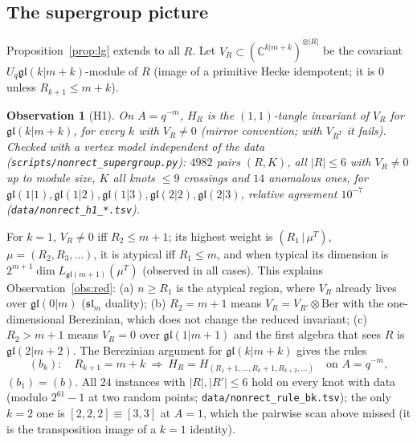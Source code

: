 \documentclass[11pt]{article}
\newtheorem{observation}{Observation}
\theoremstyle{definition}
\theoremstyle{remark}
\begin{document}
\subsection{The supergroup picture}\label{sec:super}
Proposition~\ref{prop:lg} extends to all $R$.  Let $V_R\subset(\mathbb{C}^{k|m+k})^{\otimes|R|}$ be the covariant
$U_q\mathfrak{gl}(k|m+k)$-module of $R$ (image of a primitive Hecke idempotent; it is $0$ unless $R_{k+1}\le m+k$).
\begin{observation}[H1]\label{obs:h1}
On $A=q^{-m}$, $H_R$ is the $(1,1)$-tangle invariant of $V_R$ for $\mathfrak{gl}(k|m+k)$, for every $k$ with
$V_R\ne0$ (mirror convention; with $V_{R^T}$ it fails).  Checked with a vertex model independent of the data
(\texttt{scripts/nonrect\_supergroup.py}): $4982$ pairs $(R,K)$, all $|R|\le6$ with $V_R\neq0$ up to module size,
$K$ all knots $\le9$ crossings and $14$ anomalous ones, for $\mathfrak{gl}(1|1),\mathfrak{gl}(1|2),\mathfrak{gl}(1|3),
\mathfrak{gl}(2|2),\mathfrak{gl}(2|3)$, relative agreement $10^{-7}$ (\texttt{data/nonrect\_h1\_*.tsv}).
\end{observation}
For $k=1$, $V_R\neq0$ iff $R_2\le m+1$; its highest weight is $(R_1\,|\,\mu^T)$, $\mu=(R_2,R_3,\dots)$, it is
atypical iff $R_1\le m$, and when typical its dimension is $2^{m+1}\dim L_{\mathfrak{gl}(m+1)}(\mu^T)$ (observed in all
cases).  This explains Observation~\ref{obs:red}:
(a) $n\ge R_1$ is the atypical region, where $V_R$ already lives over $\mathfrak{gl}(0|m)$ ($\mathfrak{sl}_m$ duality);
(b) $R_2=m+1$ means $V_R=V_{R'}\otimes\mathrm{Ber}$ with the one-dimensional Berezinian, which does not change the
reduced invariant; (c) $R_2>m+1$ means $V_R=0$ over $\mathfrak{gl}(1|m+1)$ and the first algebra that sees $R$ is
$\mathfrak{gl}(2|m+2)$.  The Berezinian argument for $\mathfrak{gl}(k|m+k)$ gives the rules
\[
  (b_k):\quad R_{k+1}=m+k\ \Longrightarrow\ H_R=H_{(R_1+1,\dots,R_k+1,R_{k+2},\dots)}\quad\text{on }A=q^{-m},
\]
$(b_1)=(b)$.  All $24$ instances with $|R|,|R'|\le6$ hold on every knot with data (modulo $2^{61}-1$ at two random
points; \texttt{data/nonrect\_rule\_bk.tsv}); the only $k=2$ one is $[2,2,2]\equiv[3,3]$ at $A=1$, which the
pairwise scan above missed (it is the transposition image of a $k=1$ identity).
\end{document}
